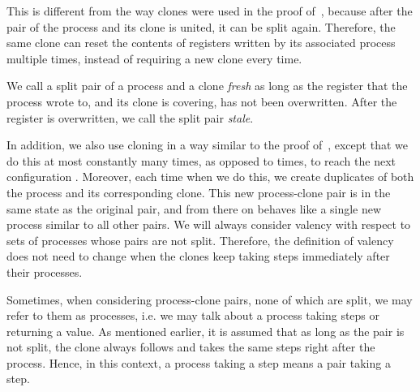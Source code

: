 This is different from the way clones were used in the proof of~,
  because after the pair of the process and its clone is united, it can be split again.
Therefore, the same clone can reset the contents of registers written by its associated process multiple times, 
instead of requiring a new clone every time.

We call a split pair of a process and a clone \emph{fresh} as long as the register that 
  the process wrote to, and its clone is covering, has not been overwritten.
After the register is overwritten, we call the split pair \emph{stale}.

In addition, we also use cloning in a way similar to the proof of~, 
  except that we do this at most constantly many times, as opposed to  times, to reach the next configuration .
Moreover, each time when we do this, we create duplicates of both the process and its corresponding clone.
This new process-clone pair is in the same state as the original pair, 
  and from there on behaves like a single new process similar to all other pairs.
We will always consider valency with respect to sets of processes whose pairs are not split. 
Therefore, the definition of valency does not need to change 
  when the clones keep taking steps immediately after their processes.

Sometimes, when considering process-clone pairs, none of which are split, 
  we may refer to them as processes, i.e. we may talk about a process taking steps or returning a value. 
As mentioned earlier, it is assumed that as long as the pair is not split, 
  the clone always follows and takes the same steps right after the process. 
Hence, in this context, a process taking a step means a pair taking a step.   

